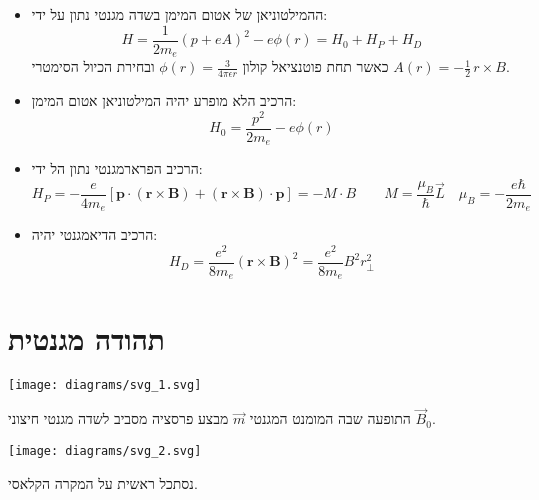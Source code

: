 \documentclass{tstextbook}
\begin{document}
\begin{summary}
  \begin{itemize}
    \item ההמילטוניאן של אטום המימן בשדה מגנטי נתון על ידי:
$$H=\frac{1}{2m_{e}}\left(p+e A\right)^{2}-e\phi(r)=H_{0}+H_{P}+H_{D}$$
כאשר תחת פוטנציאל קולון \(\phi(r)=\frac{3}{4\pi \epsilon r}\) ובחירת הכיול הסימטרי \(A(r)=-\frac{1}{2}\,r\times B\).
    \item הרכיב הלא מופרע יהיה המילטוניאן אטום המימן:
$$H_{0}=\frac{p^{2}}{2m_{e}}-e\phi(r)$$
    \item הרכיב הפרארמגנטי נתון הל ידי:
$$H_{P}=-{\frac{e}{4m_{e}}}\left[\mathbf{p}\cdot\left( \mathbf{r}\times\mathbf{B} \right)+\left( \mathbf{r}\times\mathbf{B} \right)\cdot\mathbf{p}\right]=-M\cdot B\qquad M=\frac{\mu_{B}}{\hbar}\vec{L}\quad\mu_{B}=-\frac{e\hbar}{2m_{e}}$$
    \item הרכיב הדיאמגנטי יהיה:
$$H_{D}=\frac{e^{2}}{8m_{e}}\left(\mathbf{r}\times\mathbf{B}\right)^{2}=\frac{e^{2}}{8m_{e}}B^{2}r_{\perp}^{2}$$
  \end{itemize}
\end{summary}
\section{תהודה מגנטית}

\begin{reminder}
\texttt{[image: diagrams/svg\_1.svg]}
\end{reminder}
\begin{definition}
התופעה שבה המומנט המגנטי \(\vec{m}\) מבצע פרסציה מסביב לשדה מגנטי חיצוני \(\vec{B}_{0}\).

\texttt{[image: diagrams/svg\_2.svg]}
\end{definition}
נסתכל ראשית על המקרה הקלאסי.
\end{document}
